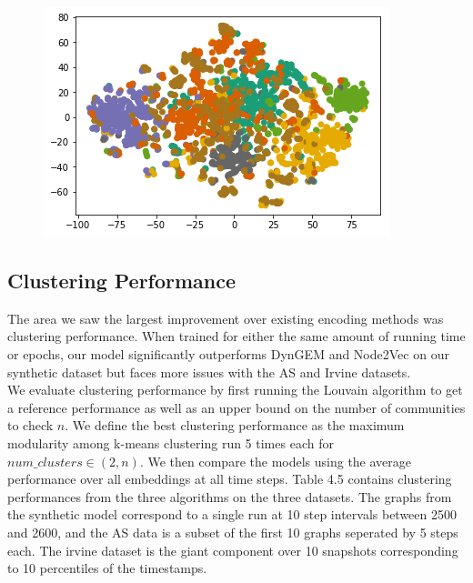 \documentclass[12pt,twoside]{report}
\begin{document}
\begin{figure}[H]
\begin{center}
\begin{minipage}{0.45\linewidth}
\end{minipage}%
\hfill
\begin{minipage}{0.45\linewidth}
\includegraphics[width=\linewidth]{figures/cora/node2vec.png}
\end{minipage}
\end{center}
\end{figure}

\subsection{Clustering Performance}

The area we saw the largest improvement over existing encoding methods was clustering performance. When trained for either the same amount of running time or epochs, our model significantly outperforms DynGEM and Node2Vec on our synthetic dataset but faces more issues with the AS\cite{leskovec2005graphs} and Irvine \cite{panzarasa2009patterns} datasets. \\

We evaluate clustering performance by first running the Louvain algorithm to get a reference performance as well as an upper bound on the number of communities to check $n$. We define the best clustering performance as the maximum modularity among k-means clustering run 5 times each for $num\_clusters \in (2, n)$. We then compare the models using the average performance over all embeddings at all time steps. Table 4.5 contains clustering performances from the three algorithms on the three datasets. The graphs from the synthetic model correspond to a single run at 10 step intervals between 2500 and 2600, and the AS data is a subset of the first 10 graphs seperated by 5 steps each. The irvine dataset is the giant component over 10 snapshots corresponding to 10 percentiles of the timestamps.  \\
\end{document}
